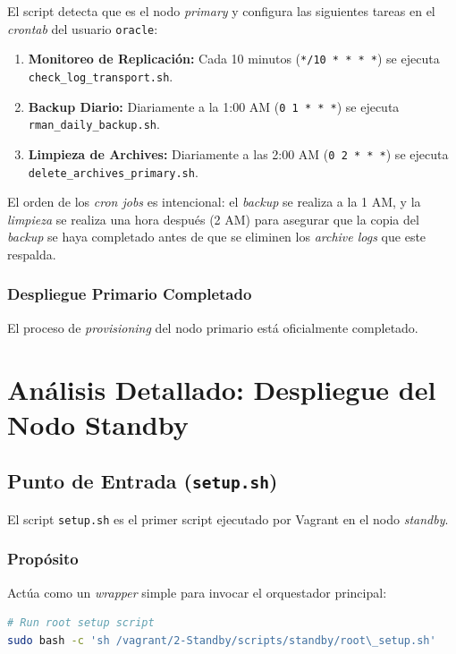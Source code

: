 \documentclass[11pt, a4paper]{report}
\begin{document}
El script detecta que es el nodo \textit{primary} y configura las siguientes tareas en el \textit{crontab} del usuario \texttt{oracle}:
\begin{enumerate}
    \item \textbf{Monitoreo de Replicación:} Cada 10 minutos (\texttt{*/10 * * * *}) se ejecuta \texttt{check\_log\_transport.sh}.
\item \textbf{Backup Diario:} Diariamente a la 1:00 AM (\texttt{0 1 * * *}) se ejecuta \texttt{rman\_daily\_backup.sh}.
\item \textbf{Limpieza de Archives:} Diariamente a las 2:00 AM (\texttt{0 2 * * *}) se ejecuta \texttt{delete\_archives\_primary.sh}.
\end{enumerate}
El orden de los \textit{cron jobs} es intencional: el \textit{backup} se realiza a la 1 AM, y la \textit{limpieza} se realiza una hora después (2 AM) para asegurar que la copia del \textit{backup} se haya completado antes de que se eliminen los \textit{archive logs} que este respalda.

\subsection{Despliegue Primario Completado}
El proceso de \textit{provisioning} del nodo primario está oficialmente completado.
\newpage


\chapter[Apéndice B: Despliegue Standby]{Análisis Detallado: Despliegue del Nodo Standby}

\section{Punto de Entrada (\texttt{setup.sh})}

El script \texttt{setup.sh} es el primer script ejecutado por Vagrant en el nodo \textit{standby}.
\subsection{Propósito}
Actúa como un \textit{wrapper} simple para invocar el orquestador principal:
\begin{lstlisting}[language=bash, caption={Invocación del Orquestador Standby}]
# Run root setup script
sudo bash -c 'sh /vagrant/2-Standby/scripts/standby/root\_setup.sh'
\end{lstlisting}
\end{document}
